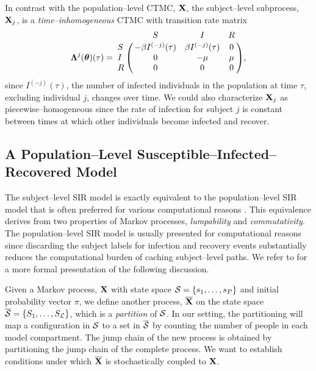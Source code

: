 In contrast with the population--level CTMC, $ \mathbf{X} $, the subject--level subprocess, $ \mathbf{X}_j $, is a \textit{time--inhomogeneous} CTMC with transition rate matrix
\begin{equation} 
\label{eqn:sir_subj_rate_mtx}
\bLambda^{j}(\btheta)(\tau) = \bordermatrix{ & S & I & R \cr
	S & -\beta I^{(-j)}(\tau) & \beta I^{(-j)}(\tau) & 0 \cr 
	I & 0 & -\mu & \mu \cr
	R & 0 & 0 & 0 },
\end{equation}
since $ I^{(-j)}(\tau) $, the number of infected individuals in the population at time $ \tau $, excluding individual $ j $, changes over time. We could also characterize $ \mathbf{X}_j $ as piecewise--homogeneous since the rate of infection for subject $ j $ is constant between times at which other individuals become infected and recover. 

\subsection{A Population--Level Susceptible--Infected--Recovered Model}
\label{subsec:sir_population_mod}
The subject--level SIR model is exactly equivalent to the population--level SIR model that is often preferred for various computational reasons \cite{allen2008introduction, andersson2000stochastic}. This equivalence derives from two properties of Markov processes, \textit{lumpability} and \textit{commutativity}. The population--level SIR model is usually presented for computational reasons since discarding the subject labels for infection and recovery events substantially reduces the computational burden of caching subject--level paths. We refer to \cite{tian2006lumpability} for a more formal presentation of the following discussion. 

Given a Markov process, $ \mathbf{X} $ with state space $ \mathcal{S} = \lbrace s_1,\dots,s_P\rbrace $ and initial probability vector $ \pi $, we define another process, $ \overline{\mathbf{X}} $ on the state space $ \overline{\mathcal{S}} = \lbrace S_1,\dots,S_\mathcal{L}\rbrace $, which is a \textit{partition} of $ \mathcal{S} $. In our setting, the partitioning will map a configuration in $ \mathcal{S} $ to a set in $ \overline{\mathcal{S}} $ by counting the number of people in each model compartment. The jump chain of the new process is obtained by partitioning the jump chain of the complete process. We want to establish conditions under which $ \overline{\mathbf{X}} $ is stochastically coupled to $ \mathbf{X} $. 


